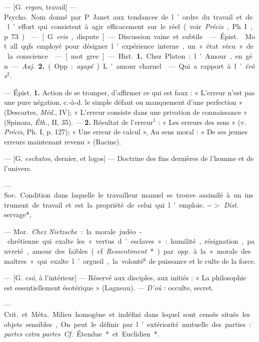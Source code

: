 \begin{itemize}[leftmargin=1cm, label=, itemsep=1pt]
 — [G. {\it ergon},
travail] — \si{Psycho.} Nom donné par
P. Janet aux tendances de l’ordre
du travail et de l’effort qui consistent à agir efficacement sur le réel
(voir  {\it Précis}, Ph. I, p. 73).

 — [G. {\it eris}, dispute] — Discussion vaine et subtile.

 — \si{Épist.}  Mot all. qqfs
employé pour désigner l’expérience
interne, un « état vécu » de la conscience.

 — [mot grec] — \si{Hist.} {\bf 1.} Chez
Platon : l'Amour, en gén. — {\it Auj.}
 {\bf 2.} (Opp. : {\it agapê}). L'amour charnel.

 — Qui a rapport à l’{\it érôs}$^2$.

 — Épist, {\bf 1.}  Action de se
tromper, d'affirmer ce qui est faux :
« L'erreur n’est pas une pure négation, c.-à-d. le simple défaut ou
manquement d'une perfection »
(Descartes, {\it Méd.}, IV); « L'erreur
consiste dans une privation de connaissance » (Spinoza, {\it Éth.}, II, 35).
— {\bf 2.}  Résultat de l'erreur$^1$ : « Les erreurs
des sens » (v.  {\it Précis}, Ph. I, p. 127); « Une erreur de calcul »,
Au sens moral : « De ses jeunes erreurs maintenant revenu » (Racine).

 — [G. {\it eschatos}, dernier, et
logos] — Doctrine des fins dernières de l’homme et de l'univers.

 — \si{Soc.} Condition dans laquelle le travailleur manuel se
trouve assimilé à un instrument de
travail et est la propriété de celui
qui l'emploie. $->$ {\it Dist.} servage*,

 — \si{Mor.} {\it Chez Nietzsche} : la morale
judéo-chrétienne qui exalte les « vertus d’esclaves » : humilité,
résignation, pauvreté, amour des faibles (cf. {\it Ressentiment}*) par
{\it opp.} à la « morale des maîtres » qui exalte l’orgueil, la
volonté$^6$ de puissance et le culte de la force.

 — [G. {\it esô}, à l'intérieur] —
Réservé aux disciples, aux initiés :
« La philosophie est essentiellement
ésotérique » (Lagneau). — {\it D'où} :
occulte, secret.

 — \si{Crit.} et \si{Méta.} Milieu homogène et indéfini
dans lequel sont censés situés les objets sensibles, On
peut le définir par l’extériorité mutuelle des parties : {\it partes
extra partes}. {\it Cf.} Étendue* et Euclidien*.


\end{itemize}

